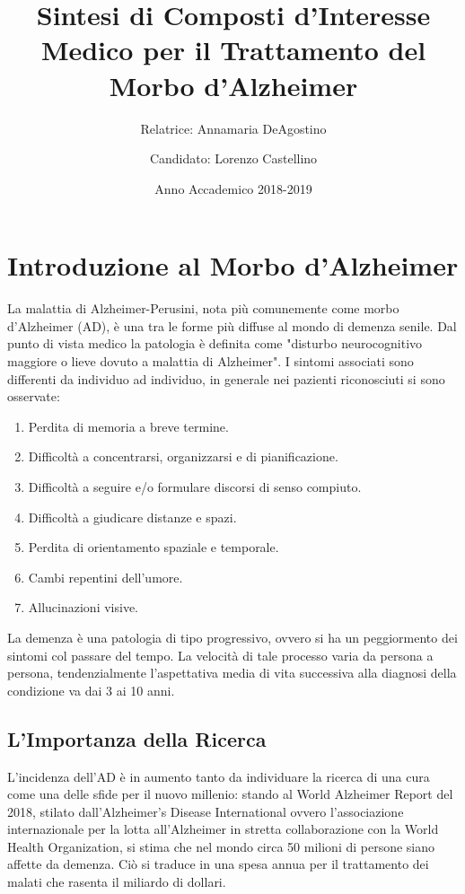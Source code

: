 \documentclass[a4paper, 12pt]{article}
\title{Sintesi di Composti d'Interesse Medico per il Trattamento del Morbo d'Alzheimer}
\author{
	Relatrice: Annamaria DeAgostino
	\and
	Candidato: Lorenzo Castellino
}
\date{Anno Accademico 2018-2019}
\begin{document}
\maketitle
\setcounter{page}{0}
\newpage
\tableofcontents
\newpage
{}

\section{Introduzione al Morbo d'Alzheimer}
La malattia di Alzheimer-Perusini, nota più comunemente come morbo d'Alzheimer (AD), è una tra le forme più diffuse al mondo di demenza senile. Dal punto di vista medico la patologia è definita come "disturbo neurocognitivo maggiore o lieve dovuto a malattia di Alzheimer".\cite{american_psychiatric_association_diagnostic_2013}
I sintomi associati sono differenti da individuo ad individuo, in generale nei pazienti riconosciuti si sono osservate:
\begin{enumerate}
	\item Perdita di memoria a breve termine.
	\item Difficoltà a concentrarsi, organizzarsi e di pianificazione.
	\item Difficoltà a seguire e/o formulare discorsi di senso compiuto.
	\item Difficoltà a giudicare distanze e spazi.
	\item Perdita di orientamento spaziale e temporale.
	\item Cambi repentini dell'umore.
	\item Allucinazioni visive.
\end{enumerate}
La demenza è una patologia di tipo progressivo, ovvero si ha un peggiormento dei sintomi col passare del tempo. La velocità di tale processo varia da persona a persona, tendenzialmente l'aspettativa media di vita successiva alla diagnosi della condizione va dai 3 ai 10 anni. \cite{todd_survival_2013}

\subsection{L'Importanza della Ricerca}
L'incidenza dell'AD è in aumento tanto da individuare la ricerca di una cura come una delle sfide per il nuovo millenio: stando al World Alzheimer Report del 2018, stilato dall'Alzheimer's Disease International ovvero l'associazione internazionale per la lotta all'Alzheimer in stretta collaborazione con la World Health Organization, si stima che nel mondo circa 50 milioni di persone siano affette da demenza. Ciò si traduce in una spesa annua per il trattamento dei malati che rasenta il miliardo di dollari.
\end{document}
